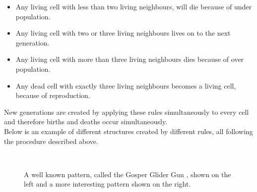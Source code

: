 \documentclass[a4paper,10pt]{article}
\begin{document}
\begin{itemize}
 \item  Any living cell with less than two living neighbours, will die because of under population.
 \item Any living cell with two or three living neighbours lives on to the next generation.
 \item Any living cell with more than three living neighbours dies because of over population.
 \item Any dead cell with exactly three living neighbours becomes a living cell, because of reproduction.
\end{itemize}

New generations are created by applying these rules simultaneously to every cell and therefore births and deaths occur simultaneously. \\

Below is an example of different structures created by different rules, all following the procedure described above.

\begin{figure}[H]
\centering
\mbox{ \quad
{}} \caption{A well known pattern, called the Gosper Glider Gun \cite{n}, shown on the left and a more interesting pattern \cite{p} shown on the right.}
\end{figure}
\end{document}
